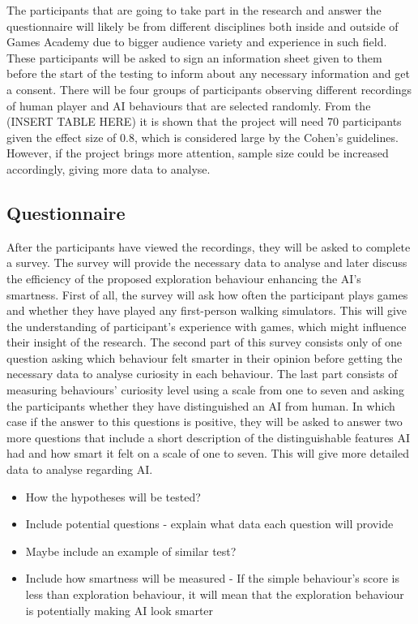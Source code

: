 \documentclass[journal]{IEEEtran}
\begin{document}
The participants that are going to take part in the research and answer the questionnaire will likely be from different disciplines both inside and outside of Games Academy due to bigger audience variety and experience in such field. These participants will be asked to sign an information sheet given to them before the start of the testing to inform about any necessary information and get a consent. There will be four groups of participants observing different recordings of human player and AI behaviours that are selected randomly. From the (INSERT TABLE HERE) it is shown that the project will need 70 participants given the effect size of 0.8, which is considered large by the Cohen's guidelines. However, if the project brings more attention, sample size could be increased accordingly, giving more data to analyse.

\subsection{Questionnaire}
After the participants have viewed the recordings, they will be asked to complete a survey. The survey will provide the necessary data to analyse and later discuss the efficiency of the proposed exploration behaviour enhancing the AI's smartness. First of all, the survey will ask how often the participant plays games and whether they have played any first-person walking simulators. This will give the understanding of participant's experience with games, which might influence their insight of the research. The second part of this survey consists only of one question asking which behaviour felt smarter in their opinion before getting the necessary data to analyse curiosity in each behaviour. The last part consists of measuring behaviours' curiosity level using a scale from one to seven and asking the participants whether they have distinguished an AI from human. In which case if the answer to this questions is positive, they will be asked to answer two more questions that include a short description of the distinguishable features AI had and how smart it felt on a scale of one to seven. This will give more detailed data to analyse regarding AI.

\begin{itemize}
	\item How the hypotheses will be tested?
	\item Include potential questions - explain what data each question will provide
	\item Maybe include an example of similar test?
	\item Include how smartness will be measured - If the simple behaviour's score is less than exploration behaviour, it will mean that the exploration behaviour is potentially making AI look smarter
\end{itemize}
\end{document}
